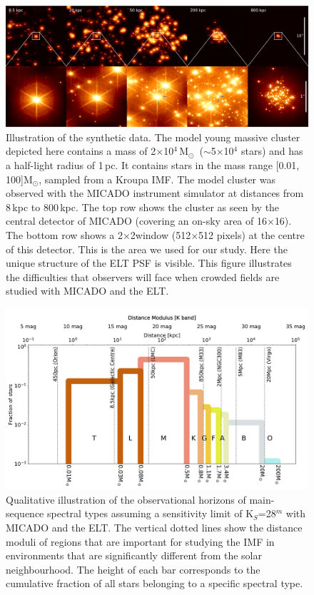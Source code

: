 \documentclass{aa}
\newcommand{\msun}{M$_\odot$~}
\newcommand{\msune}{M$_\odot$}
\begin{document}
\begin{figure}
    \centering
    \includegraphics[width=\textwidth]{5_clusters.pdf}
    \caption{Illustration of the synthetic data.
    The model young massive cluster depicted here contains a mass of 2$\times$10$^4$\,\msun ($\sim$5$\times$10$^4$ stars) and has a half-light radius of 1\,pc.
    It contains stars in the mass range [0.01, 100]\msune, sampled from a Kroupa IMF.
    The model cluster was observed with the MICADO instrument simulator at distances from 8\,kpc to 800\,kpc.
    The top row shows the cluster as seen by the central detector of MICADO (covering an on-sky area of 16\arcsec$\times$16\arcsec).
    The bottom row shows a 2\arcsec$\times$2\arcsec window (512$\times$512 pixels) at the centre of this detector.
    This is the area we used for our study.
    Here the unique structure of the ELT PSF is visible.
    This figure illustrates the difficulties that observers will face when crowded fields are studied with MICADO and the ELT.
    }
    \label{fig:5_clusters}
\end{figure}


\begin{figure}
    \centering
    \includegraphics[width=\textwidth]{imf_educational.pdf}
    \caption{Qualitative illustration of the observational horizons of main-sequence spectral types assuming a sensitivity limit of K$_S$=28$^m$ with MICADO and the ELT.
    The vertical dotted lines show the distance moduli of regions that are important for studying the IMF in environments that are significantly different from the solar neighbourhood.
    The height of each bar corresponds to the cumulative fraction of all stars belonging to a specific spectral type.
    }
    \label{fig:imf_educational}
\end{figure}
\end{document}
